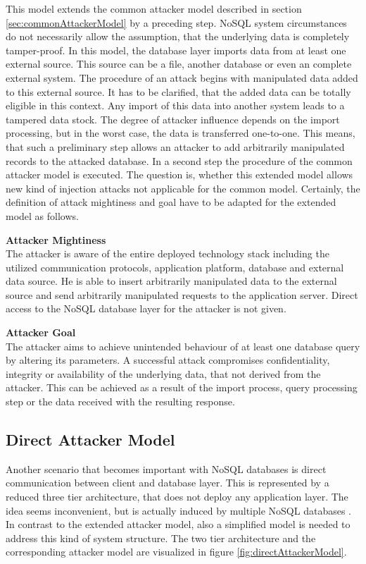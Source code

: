 This model extends the common attacker model described in section \ref{sec:commonAttackerModel} by a preceding step. NoSQL system circumstances do not necessarily allow the assumption, that the underlying data is completely tamper-proof. In this model, the database layer imports data from at least one external source. This source can be a file, another database or even an complete external system. The procedure of an attack begins with manipulated data added to this external source. It has to be clarified, that the added data can be totally eligible in this context. Any import of this data into another system leads to a tampered data stock. The degree of attacker influence depends on the import processing, but in the worst case, the data is transferred one-to-one. This means, that such a preliminary step allows an attacker to add arbitrarily manipulated records to the attacked database. In a second step the procedure of the common attacker model is executed. The question is, whether this extended model allows new kind of injection attacks not applicable for the common model. Certainly, the definition of attack mightiness and goal have to be adapted for the extended model as follows. \\

\begin{minipage}[t]{0.48\textwidth}
  \textbf{Attacker Mightiness} \\ 
  The attacker is aware of the entire deployed technology stack including the utilized communication protocols, application platform, database and external data source. He is able to insert arbitrarily manipulated data to the external source and send arbitrarily manipulated requests to the application server. Direct access to the NoSQL database layer for the attacker is not given.
\end{minipage}
\hfill
\begin{minipage}[t]{0.48\textwidth}
  \textbf{Attacker Goal} \\ 
  The attacker aims to achieve unintended behaviour of at least one database query by altering its parameters. A successful attack compromises confidentiality, integrity or availability of the underlying data, that not derived from the attacker. This can be achieved as a result of the import process, query processing step or the data received with the resulting response.
\end{minipage}

\subsection{Direct Attacker Model}
Another scenario that becomes important with NoSQL databases is direct communication between client and database layer. This is represented by a reduced three tier architecture, that does not deploy any application layer. The idea seems inconvenient, but is actually induced by multiple NoSQL databases \cite{Anderson:2010a}. In contrast to the extended attacker model, also a simplified model is needed to address this kind of system structure. The two tier architecture and the corresponding attacker model are visualized in figure \ref{fig:directAttackerModel}.

